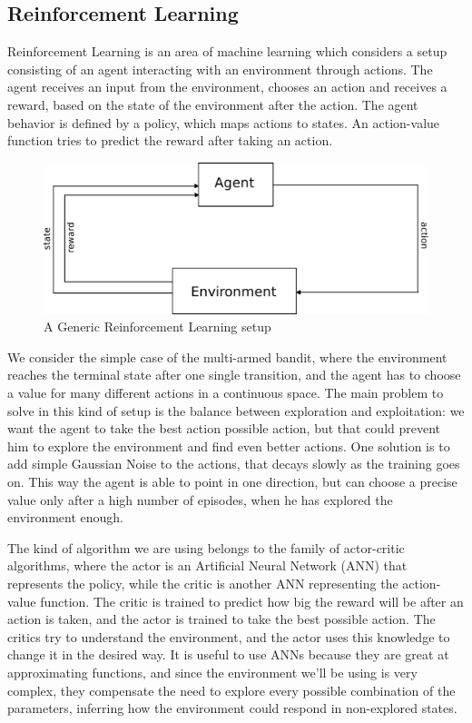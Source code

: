 \subsection{Reinforcement Learning} 

Reinforcement Learning is an area of machine learning which considers a setup consisting of an agent interacting with an environment through actions. The agent receives an input from the environment, chooses an action and receives a reward, based on the state of the environment after the action.
The agent behavior is defined by a policy, which maps actions to states. An action-value function tries to predict the reward after taking an action.

\begin{figure}[h]
	\centering
	\includegraphics[scale=0.5]{pictures/rl.pdf}
	\caption{A Generic Reinforcement Learning setup}
	\label{fig:rl}
\end{figure}

We consider the simple case of the multi-armed bandit, where the environment reaches the terminal state after one single transition, and the agent has to choose a value for many different actions in a continuous space. The main problem to solve in this kind of setup is the balance between exploration and exploitation: we want the agent to take the best action possible action, but that could prevent him to explore the environment and find even better actions. One solution is to add simple Gaussian Noise to the actions, that decays slowly as the training goes on. This way the agent is able to point in one direction, but can choose a precise value only after a high number of episodes, when he has explored the environment enough.

The kind of algorithm we are using belongs to the family of actor-critic algorithms, where the actor is an Artificial Neural Network (ANN) that represents the policy, while the critic is another ANN representing the action-value function.
The critic is trained to predict how big the reward will be after an action is taken, and the actor is trained to take the best possible action. The critics try to understand the environment, and the actor uses this knowledge to change it in the desired way. It is useful to use ANNs because they are great at approximating functions, and since the environment we'll be using is very complex, they compensate the need to explore every possible combination of the parameters, inferring how the environment could respond in non-explored states.

